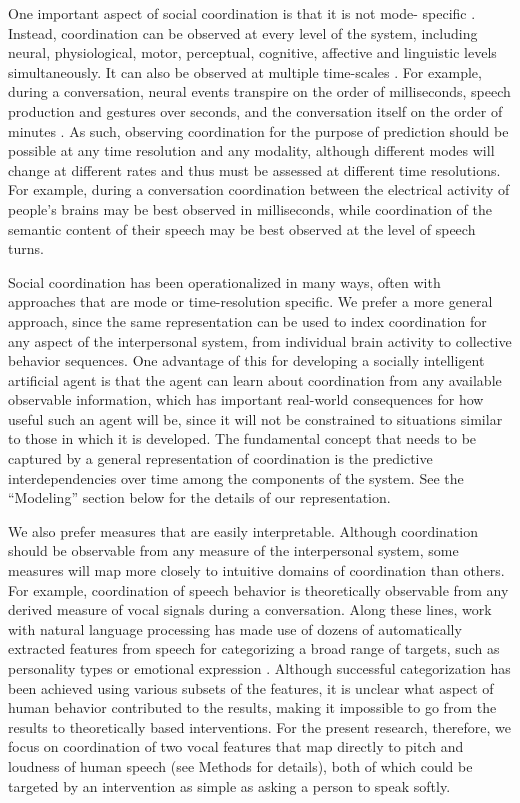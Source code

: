One important aspect of social coordination is that it is not mode- specific
\citep{eiler2017interaction}. Instead, coordination can be observed at every level of
the system, including neural, physiological, motor, perceptual, cognitive,
affective and linguistic levels simultaneously. It can also be observed at
multiple time-scales \citep{wiltshire2019multiscale}. For example, during a
conversation, neural events transpire on the order of milliseconds, speech
production and gestures over seconds, and the conversation itself on the order
of minutes \citep{hasson2012brain}. As such, observing coordination for the
purpose of prediction should be possible at any time resolution and any
modality, although different modes will change at different rates and thus must
be assessed at different time resolutions. For example, during a conversation
coordination between the electrical activity of people’s brains may be best
observed in milliseconds, while coordination of the semantic content of their
speech may be best observed at the level of speech turns.

Social coordination has been operationalized in many ways, often with approaches
that are mode or time-resolution specific. We prefer a more general approach,
since the same representation can be used to index coordination for any aspect
of the interpersonal system, from individual brain activity to collective
behavior sequences. One advantage of this for developing a socially intelligent
artificial agent is that the agent can learn about coordination from any
available observable information, which has important real-world consequences
for how useful such an agent will be, since it will not be constrained to
situations similar to those in which it is developed. The fundamental concept
that needs to be captured by a general representation of coordination is the
predictive interdependencies over time among the components of the system. See
the “Modeling” section below for the details of our representation.

We also prefer measures that are easily interpretable. Although coordination
should be observable from any measure of the interpersonal system, some measures
will map more closely to intuitive domains of coordination than others. For
example, coordination of speech behavior is theoretically observable from any
derived measure of vocal signals during a conversation. Along these lines, work
with natural language processing has made use of dozens of automatically
extracted features from speech for categorizing a broad range of targets, such
as personality types or emotional expression \citep{eyben2010opensmile}. Although
successful categorization has been achieved using various subsets of the
features, it is unclear what aspect of human behavior contributed to the
results, making it impossible to go from the results to theoretically based
interventions. For the present research, therefore, we focus on coordination of
two vocal features that map directly to pitch and loudness of human speech (see
Methods for details), both of which could be targeted by an intervention as
simple as asking a person to speak softly. 

